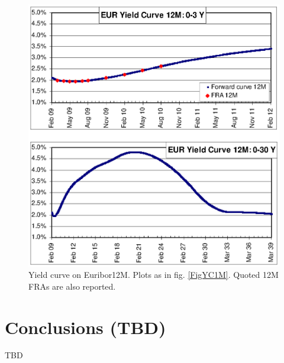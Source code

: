 \documentclass[11pt,reqno]{amsart}
\begin{document}
\begin{figure}[p]
\centering
\includegraphics[scale=1.0]{./FigYC12M}
\caption{Yield curve on Euribor12M. Plots as in fig. \protect\ref{FigYC1M}. Quoted 12M FRAs are also reported.}
\label{FigYC12M}
\end{figure}
\newpage

\section{Conclusions (TBD)}
\label{sec:Conclusions}
TBD


%


\end{document}
